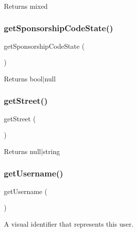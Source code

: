 \begin{DoxyReturn}{Returns}
mixed 
\end{DoxyReturn}
\mbox{\label{class_app_1_1_entity_1_1_user_a6eaf2212f9e9e409fab30ffa0b57e3aa}} 
\subsubsection{\texorpdfstring{getSponsorshipCodeState()}{getSponsorshipCodeState()}}
{\footnotesize\ttfamily get\+Sponsorship\+Code\+State (\begin{DoxyParamCaption}{ }\end{DoxyParamCaption})}

\begin{DoxyReturn}{Returns}
bool$\vert$null 
\end{DoxyReturn}
\mbox{\label{class_app_1_1_entity_1_1_user_ad804bd3a7447b83b37d6de35f2056fb2}} 
\subsubsection{\texorpdfstring{getStreet()}{getStreet()}}
{\footnotesize\ttfamily get\+Street (\begin{DoxyParamCaption}{ }\end{DoxyParamCaption})}

\begin{DoxyReturn}{Returns}
null$\vert$string 
\end{DoxyReturn}
\mbox{\label{class_app_1_1_entity_1_1_user_a81b37a3c9d639574e394f80c1138c75e}} 
\subsubsection{\texorpdfstring{getUsername()}{getUsername()}}
{\footnotesize\ttfamily get\+Username (\begin{DoxyParamCaption}{ }\end{DoxyParamCaption})}

A visual identifier that represents this user.

